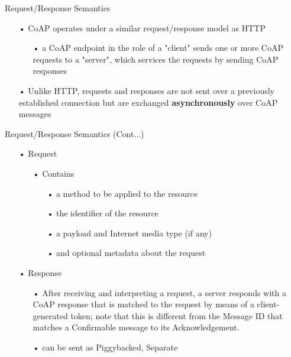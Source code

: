\documentclass[11pt]{beamer}
\begin{document}
\begin{frame}{Request/Response Semantics}
\begin{itemize}
\item[•] CoAP operates under a similar request/response model as HTTP
\begin{itemize}
\item[•] a CoAP endpoint in the role of a "client" sends one or more CoAP requests to a "server", which services the requests by sending CoAP responses
\end{itemize}
\item[•] Unlike HTTP, requests and responses are not sent over a previously established connection but are exchanged \textbf{asynchronously} over CoAP messages
\end{itemize}
\end{frame}
\begin{frame}{Request/Response Semantics (Cont...)}
\begin{itemize}
\item[•] Request
\begin{itemize}
\item[•] Contains
\begin{itemize}
\item[•] a method to be applied to the resource
\item[•] the identifier of the resource
\item[•] a payload and Internet media type (if any)
\item[•] and optional metadata about the request
\end{itemize}
\end{itemize}
\item[•] Response
\begin{itemize}
\item[•] After receiving and interpreting a request, a server responds with a CoAP response that is matched to the request by means of a client-generated token; note that this is different from the Message ID that matches a Confirmable message to its Acknowledgement.
\item[•] can be sent as Piggybacked, Separate 
\end{itemize}
\end{itemize}
\end{frame}
\end{document}
